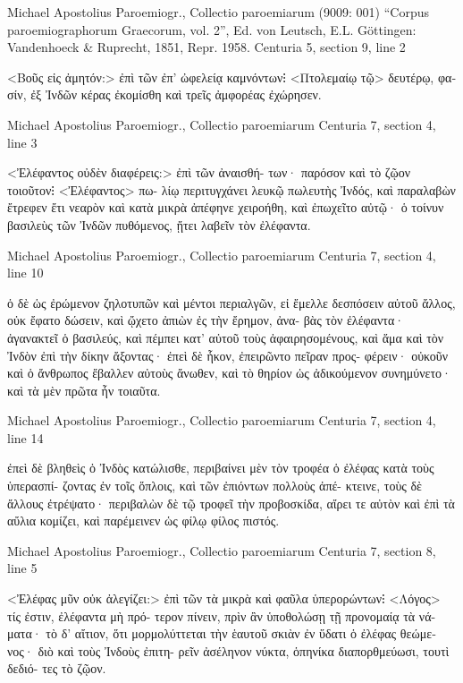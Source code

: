 \documentclass[12pt,letterpaper,twoside,final]{memoir}
\begin{document}
\begin{greek}

Michael Apostolius Paroemiogr., Collectio paroemiarum (9009: 001)
“Corpus paroemiographorum Graecorum, vol. 2”, Ed. von Leutsch, E.L.
Göttingen: Vandenhoeck \& Ruprecht, 1851, Repr. 1958.
Centuria 5, section 9, line 2

<Βοῦς εἰς ἀμητόν:> ἐπὶ τῶν ἐπ' ὠφελείᾳ καμνόντων⁝ 
<Πτολεμαίῳ τῷ> δευτέρῳ, φασίν, ἐξ Ἰνδῶν κέρας ἐκομίσθη 
καὶ τρεῖς ἀμφορέας ἐχώρησεν. 



Michael Apostolius Paroemiogr., Collectio paroemiarum 
Centuria 7, section 4, line 3

<Ἐλέφαντος οὐδὲν διαφέρεις:> ἐπὶ τῶν ἀναισθή-
των· παρόσον καὶ τὸ ζῷον τοιοῦτον⁝ <Ἐλέφαντος> πω-
λίῳ περιτυγχάνει λευκῷ πωλευτὴς Ἰνδός, καὶ παραλαβὼν 
ἔτρεφεν ἔτι νεαρὸν καὶ κατὰ μικρὰ ἀπέφηνε χειροήθη, καὶ 
ἐπωχεῖτο αὐτῷ· ὁ τοίνυν βασιλεὺς τῶν Ἰνδῶν πυθόμενος, 
ᾔτει λαβεῖν τὸν ἐλέφαντα. 



Michael Apostolius Paroemiogr., Collectio paroemiarum 
Centuria 7, section 4, line 10

                                 ὁ δὲ ὡς ἐρώμενον ζηλοτυπῶν 
καὶ μέντοι περιαλγῶν, εἰ ἔμελλε δεσπόσειν αὐτοῦ ἄλλος, 
οὐκ ἔφατο δώσειν, καὶ ᾤχετο ἀπιὼν ἐς τὴν ἔρημον, ἀνα-
βὰς τὸν ἐλέφαντα· ἀγανακτεῖ ὁ βασιλεύς, καὶ πέμπει κατ' 
αὐτοῦ τοὺς ἀφαιρησομένους, καὶ ἅμα καὶ τὸν Ἰνδὸν ἐπὶ 
τὴν δίκην ἄξοντας· ἐπεὶ δὲ ἧκον, ἐπειρῶντο πεῖραν προς-  
φέρειν· οὐκοῦν καὶ ὁ ἄνθρωπος ἔβαλλεν αὐτοὺς ἄνωθεν, 
καὶ τὸ θηρίον ὡς ἀδικούμενον συνημύνετο· καὶ τὰ μὲν 
πρῶτα ἦν τοιαῦτα. 



Michael Apostolius Paroemiogr., Collectio paroemiarum 
Centuria 7, section 4, line 14

                      ἐπεὶ δὲ βληθεὶς ὁ Ἰνδὸς κατώλισθε, 
περιβαίνει μὲν τὸν τροφέα ὁ ἐλέφας κατὰ τοὺς ὑπερασπί-
ζοντας ἐν τοῖς ὅπλοις, καὶ τῶν ἐπιόντων πολλοὺς ἀπέ-
κτεινε, τοὺς δὲ ἄλλους ἐτρέψατο· περιβαλὼν δὲ τῷ τροφεῖ 
τὴν προβοσκίδα, αἴρει τε αὐτὸν καὶ ἐπὶ τὰ αὔλια κομίζει, 
καὶ παρέμεινεν ὡς φίλῳ φίλος πιστός. 



Michael Apostolius Paroemiogr., Collectio paroemiarum 
Centuria 7, section 8, line 5

<Ἐλέφας μῦν οὐκ ἀλεγίζει:> ἐπὶ τῶν τὰ μικρὰ καὶ 
φαῦλα ὑπερορώντων⁝ <Λόγος> τίς ἐστιν, ἐλέφαντα μὴ πρό-
τερον πίνειν, πρὶν ἂν ὑποθολώσῃ τῇ προνομαίᾳ τὰ νά-
ματα· τὸ δ' αἴτιον, ὅτι μορμολύττεται τὴν ἑαυτοῦ σκιὰν 
ἐν ὕδατι ὁ ἐλέφας θεώμενος· διὸ καὶ τοὺς Ἰνδοὺς ἐπιτη-
ρεῖν ἀσέληνον νύκτα, ὁπηνίκα διαπορθμεύωσι, τουτὶ δεδιό-
τες τὸ ζῷον. 




\end{greek}
\end{document}
